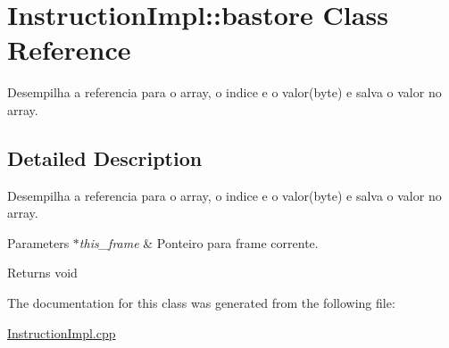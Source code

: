 \hypertarget{class_instruction_impl_1_1bastore}{}\section{Instruction\+Impl\+:\+:bastore Class Reference}
\label{class_instruction_impl_1_1bastore}


Desempilha a referencia para o array, o indice e o valor(byte) e salva o valor no array.  




\subsection{Detailed Description}
Desempilha a referencia para o array, o indice e o valor(byte) e salva o valor no array. 


\begin{DoxyParams}{Parameters}
{\em $\ast$this\+\_\+frame} & Ponteiro para frame corrente. \\
\hline
\end{DoxyParams}
\begin{DoxyReturn}{Returns}
void 
\end{DoxyReturn}


The documentation for this class was generated from the following file\+:\begin{DoxyCompactItemize}
\item 
\hyperlink{_instruction_impl_8cpp}{Instruction\+Impl.\+cpp}\end{DoxyCompactItemize}
